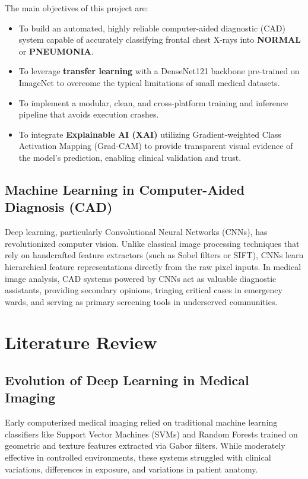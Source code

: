 \documentclass[12pt,oneside]{report}
\begin{document}
\noindent The main objectives of this project are:
\begin{itemize}[label=\textbullet]
    \item To build an automated, highly reliable computer-aided diagnostic (CAD) system capable of accurately classifying frontal chest X-rays into \textbf{NORMAL} or \textbf{PNEUMONIA}.
    \item To leverage \textbf{transfer learning} with a DenseNet121 backbone pre-trained on ImageNet to overcome the typical limitations of small medical datasets.
    \item To implement a modular, clean, and cross-platform training and inference pipeline that avoids execution crashes.
    \item To integrate \textbf{Explainable AI (XAI)} utilizing Gradient-weighted Class Activation Mapping (Grad-CAM) to provide transparent visual evidence of the model's prediction, enabling clinical validation and trust.
\end{itemize}

\section{Machine Learning in Computer-Aided Diagnosis (CAD)}
Deep learning, particularly Convolutional Neural Networks (CNNs), has revolutionized computer vision. Unlike classical image processing techniques that rely on handcrafted feature extractors (such as Sobel filters or SIFT), CNNs learn hierarchical feature representations directly from the raw pixel inputs. In medical image analysis, CAD systems powered by CNNs act as valuable diagnostic assistants, providing secondary opinions, triaging critical cases in emergency wards, and serving as primary screening tools in underserved communities.

\chapter{Literature Review}

\section{Evolution of Deep Learning in Medical Imaging}
Early computerized medical imaging relied on traditional machine learning classifiers like Support Vector Machines (SVMs) and Random Forests trained on geometric and texture features extracted via Gabor filters. While moderately effective in controlled environments, these systems struggled with clinical variations, differences in exposure, and variations in patient anatomy. 
\end{document}
